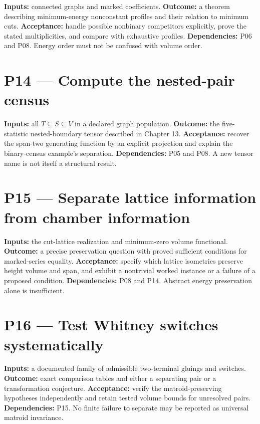 \documentclass[
  11pt,
  a4paper,
]{report}
\begin{document}
\textbf{Inputs:} connected graphs and marked coefficients.
\textbf{Outcome:} a theorem describing minimum-energy nonconstant
profiles and their relation to minimum cuts. \textbf{Acceptance:} handle
possible nonbinary competitors explicitly, prove the stated
multiplicities, and compare with exhaustive profiles.
\textbf{Dependencies:} P06 and P08. Energy order must not be confused
with volume order.

\hypertarget{p14-compute-the-nested-pair-census}{%
\section{P14 --- Compute the nested-pair
census}\label{p14-compute-the-nested-pair-census}}

\textbf{Inputs:} all \(T\subseteq S\subseteq V\) in a declared graph
population. \textbf{Outcome:} the five-statistic nested-boundary tensor
described in Chapter 13. \textbf{Acceptance:} recover the span-two
generating function by an explicit projection and explain the
binary-census example's separation. \textbf{Dependencies:} P05 and P08.
A new tensor name is not itself a structural result.

\hypertarget{p15-separate-lattice-information-from-chamber-information}{%
\section{P15 --- Separate lattice information from chamber
information}\label{p15-separate-lattice-information-from-chamber-information}}

\textbf{Inputs:} the cut-lattice realization and minimum-zero volume
functional. \textbf{Outcome:} a precise preservation question with
proved sufficient conditions for marked-series equality.
\textbf{Acceptance:} specify which lattice isometries preserve height
volume and span, and exhibit a nontrivial worked instance or a failure
of a proposed condition. \textbf{Dependencies:} P08 and P14. Abstract
energy preservation alone is insufficient.

\hypertarget{p16-test-whitney-switches-systematically}{%
\section{P16 --- Test Whitney switches
systematically}\label{p16-test-whitney-switches-systematically}}

\textbf{Inputs:} a documented family of admissible two-terminal gluings
and switches. \textbf{Outcome:} exact comparison tables and either a
separating pair or a transformation conjecture. \textbf{Acceptance:}
verify the matroid-preserving hypotheses independently and retain tested
volume bounds for unresolved pairs. \textbf{Dependencies:} P15. No
finite failure to separate may be reported as universal matroid
invariance.
\end{document}
